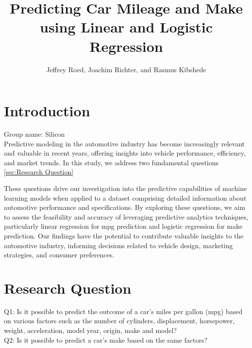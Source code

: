 \documentclass[a4paper, twocolumn]{article}
\author{Jeffrey Roed, Joachim Richter, and Rasmus Kibshede}
\title{Predicting Car Mileage and Make using Linear and Logistic Regression}
\begin{document}


\section{Introduction\label{sec:Introduction}}
Group name: Silicon\\
Predictive modeling in the automotive industry has become increasingly relevant and valuable in recent years, offering insights into vehicle performance, efficiency, and market trends. In this study, we address two fundamental questions \ref{sec:Research Question}
 
These questions drive our investigation into the predictive capabilities of machine learning models when applied to a dataset comprising detailed information about automotive performance and specifications. By exploring these questions, we aim to assess the feasibility and accuracy of leveraging predictive analytics techniques, particularly linear regression for mpg prediction and logistic regression for make prediction. Our findings have the potential to contribute valuable insights to the automotive industry, informing decisions related to vehicle design, marketing strategies, and consumer preferences.



\section{Research Question\label{sec:Research Question}}
Q1: Is it possible to predict the outcome of a car's miles per gallon (mpg) based on various factors such as the number of cylinders, displacement, horsepower, weight, acceleration, model year, origin, make and model?\\
Q2: Is it possible to predict a car's make based on the same factors?
\end{document}
